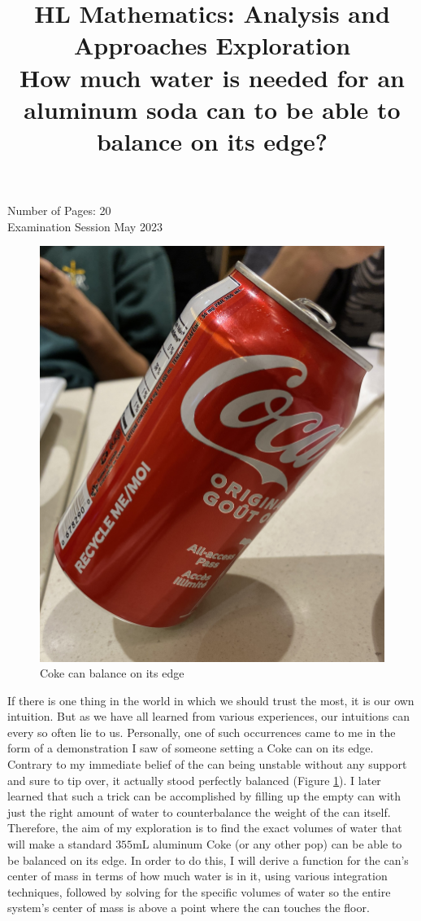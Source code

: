 \documentclass[11pt]{article}
\title{HL Mathematics: Analysis and Approaches Exploration\\How much water is needed for an aluminum soda can to be able to balance on its edge?}
\author{\vspace{-5ex}}
\date{\vspace{-5ex}}
\begin{document}
    \maketitle
    \vfill
    \begin{center}
        Number of Pages: 20 \\
        Examination Session May 2023
    \end{center}
    \thispagestyle{empty}

    \clearpage

    \begin{figure}
        \centering
        \includegraphics[width=.8\linewidth]{images/demonstration.jpg}
        \vspace{-10pt}
        \caption{Coke can balance on its edge}
        \label{fig:demo-image}
    \end{figure}

    If there is one thing in the world in which we should trust the most, it is our own intuition. But as we have all learned from various experiences, our intuitions can every so often lie to us. Personally, one of such occurrences came to me in the form of a demonstration I saw of someone setting a Coke can on its edge. Contrary to my immediate belief of the can being unstable without any support and sure to tip over, it actually stood perfectly balanced (Figure \ref{fig:demo-image}). I later learned that such a trick can be accomplished by filling up the empty can with just the right amount of water to counterbalance the weight of the can itself. Therefore, the aim of my exploration is to find the exact volumes of water that will make a standard $355 \mathrm{mL}$ aluminum Coke (or any other pop) can be able to be balanced on its edge. In order to do this, I will derive a function for the can's center of mass in terms of how much water is in it, using various integration techniques, followed by solving for the specific volumes of water so the entire system's center of mass is above a point where the can touches the floor.
\end{document}
